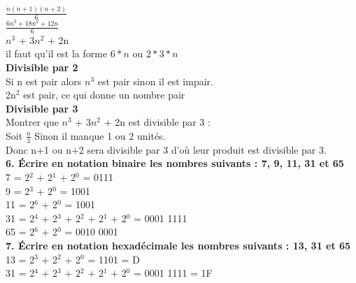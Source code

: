 $\frac{n(n+1)(n+2)} {6}$ \\

$\frac{6n^{3} + 18n^{2} + 12n}{6}$ \\

$n^{3}$ + $3n^{2}$ + 2n \\

il faut qu'il est la forme $6*n$ ou $2*3*n$ \\

\textbf{Divisible par 2} \\

Si n est pair alors $n^{3}$ est pair sinon il est impair. \\

2n$^{2}$ est pair, ce qui donne un nombre pair \\


\textbf{Divisible par 3} \\

Montrer que $n^{3}$ + $3n^{2}$ + 2n est divisible par 3 : \\

Soit $\frac{n}{3}$ Sinon il manque 1 ou 2 unités. \\

Donc n+1 ou n+2 sera divisible par 3 d'où leur produit est divisible par 3.\\


\textbf{6. Écrire en notation binaire les nombres suivants : 7, 9, 11, 31 et 65} \\

7 = 2$^{2}$ + 2$^{1}$ + 2$^{0}$ = 0111 \\

9 = 2$^{3}$ + 2$^{0}$ = 1001 \\

11 = 2$^{6}$ + 2$^{0}$ = 1001 \\

31 = 2$^{4}$ + 2$^{3}$ + 2$^{2}$ + 2$^{1}$ + 2$^{0}$ = 0001 1111 \\

65 = 2$^{6}$ + 2$^{0}$ = 0010 0001 \\

\textbf{7. Écrire en notation hexadécimale les nombres suivants : 13, 31 et 65} \\

13 = 2$^{3}$ + 2$^{2}$ + 2$^{0}$ = 1101 = D \\

31 = 2$^{4}$ + 2$^{3}$ + 2$^{2}$ + 2$^{1}$ + 2$^{0}$ = 0001 1111 = 1F \\

